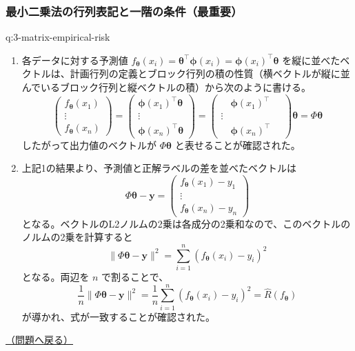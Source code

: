 \documentclass[
  pandoc]{bxjsarticle}
\begin{document}
\subsubsection{最小二乗法の行列表記と一階の条件（最重要）}\label{ux6700ux5c0fux4e8cux4e57ux6cd5ux306eux884cux5217ux8868ux8a18ux3068ux4e00ux968eux306eux6761ux4ef6ux6700ux91cdux8981-1}

\begin{answerbox}[phantomlabel=a:3-matrix-empirical-risk]{q:3-matrix-empirical-risk}

\begin{enumerate}
\def\labelenumi{\arabic{enumi}.}
\item
  各データに対する予測値
  \(f_{\boldsymbol{\theta}}(x_i) = \boldsymbol{\theta}^\top \boldsymbol{\phi}(x_i) = \boldsymbol{\phi}(x_i)^\top \boldsymbol{\theta}\)
  を縦に並べたベクトルは、計画行列の定義とブロック行列の積の性質（横ベクトルが縦に並んでいるブロック行列と縦ベクトルの積）から次のように書ける。
  \[
  \begin{pmatrix} f_{\boldsymbol{\theta}}(x_1) \\ \vdots \\ f_{\boldsymbol{\theta}}(x_n) \end{pmatrix}
  = \begin{pmatrix} \boldsymbol{\phi}(x_1)^\top \boldsymbol{\theta} \\ \vdots \\ \boldsymbol{\phi}(x_n)^\top \boldsymbol{\theta} \end{pmatrix}
  = \begin{pmatrix} \quad \boldsymbol{\phi}(x_1)^\top \quad \\ \vdots \\ \quad \boldsymbol{\phi}(x_n)^\top \quad \end{pmatrix} \boldsymbol{\theta}
  = \Phi \boldsymbol{\theta}
  \] したがって出力値のベクトルが \(\Phi \boldsymbol{\theta}\)
  と表せることが確認された。
\item
  上記1の結果より、予測値と正解ラベルの差を並べたベクトルは \[
  \Phi \boldsymbol{\theta} - \mathbf{y} = \begin{pmatrix} f_{\boldsymbol{\theta}}(x_1) - y_1 \\ \vdots \\ f_{\boldsymbol{\theta}}(x_n) - y_n \end{pmatrix}
  \]
  となる。ベクトルのL2ノルムの2乗は各成分の2乗和なので、このベクトルのノルムの2乗を計算すると
  \[
  \|\Phi\boldsymbol{\theta} - \mathbf{y}\|^2 = \sum_{i=1}^n (f_{\boldsymbol{\theta}}(x_i) - y_i)^2
  \] となる。両辺を \(n\) で割ることで、 \[
  \frac{1}{n}\|\Phi\boldsymbol{\theta} - \mathbf{y}\|^2 = \frac{1}{n} \sum_{i=1}^n (f_{\boldsymbol{\theta}}(x_i) - y_i)^2 = \hat{R}(f_{\boldsymbol{\theta}})
  \] が導かれ、式が一致することが確認された。
\end{enumerate}

\hfill 

\hyperref[q:3-matrix-empirical-risk]{（問題へ戻る）}

\end{answerbox}
\end{document}
